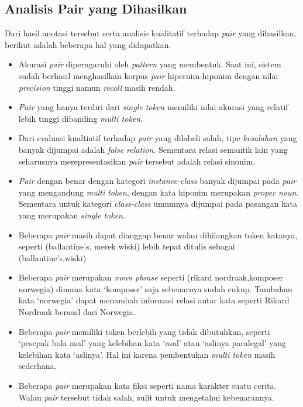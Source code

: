 \subsection{Analisis Pair yang Dihasilkan}
Dari hasil anotasi tersebut serta analisis kualitatif terhadap \textit{pair} yang dihasilkan, berikut adalah beberapa hal yang didapatkan.
\begin{itemize} 
  \item Akurasi \textit{pair} diperngaruhi oleh \textit{pattern} yang membentuk. Saat ini, sistem sudah berhasil menghasilkan korpus \textit{pair} hipernim-hiponim dengan nilai \textit{precision} tinggi namun \textit{recall} masih rendah.
  \item \textit{Pair} yang hanya terdiri dari \textit{single token} memiliki nilai akurasi yang relatif lebih tinggi dibanding \textit{multi token}.
  \item Dari evaluasi kualtiatif terhadap \textit{pair} yang dilabeli salah, tipe \textit{kesalahan} yang banyak dijumpai adalah \textit{false relation}. Sementara relasi semantik lain yang seharusnya merepresentasikan \textit{pair} tersebut adalah relasi sinonim.
  \item \textit{Pair} dengan benar dengan kategori \textit{instance-class} banyak dijumpai pada \textit{pair} yang mengandung \textit{multi token}, dengan kata hiponim merupakan \textit{proper noun}. Sementara untuk kategori \textit{class-class} umumnya dijumpai pada pasangan kata yang merupakan \textit{single token}. 
  \item Beberapa \textit{pair} masih dapat dianggap benar walau dihilangkan token katanya, seperti (ballantine's, merek wiski) lebih tepat ditulis sebagai (ballantine's,wiski)
  \item Beberapa \textit{pair} merupakan \textit{noun phrase} seperti (rikard nordraak,komposer norwegia) dimana kata `komposer' saja sebenarnya sudah cukup. Tambahan kata `norwegia' dapat menambah informasi relasi antar kata seperti Rikard Nordraak berasal dari Norwegia.
  \item Beberapa \textit{pair} memiliki token berlebih yang tidak dibutuhkan, seperti `pesepak bola asal' yang kelebihan kata `asal' atau `aslinya paralegal' yang kelebihan kata `aslinya'. Hal ini karena pembentukan \textit{multi token} masih sederhana. 
  \item Beberapa \textit{pair} merupakan kata fiksi seperti nama karakter suatu cerita. Walau \textit{pair} tersebut tidak salah, sulit untuk mengetahui kebenarannya.
\end{itemize}

